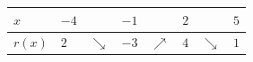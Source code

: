 \documentclass[border=.4pt]{standalone}
\begin{document}
\color{ink}\begin{tabular}{|>{\centering\arraybackslash}m{1.7cm}|>{\centering\arraybackslash}m{1.25cm}|>{\centering\arraybackslash}m{1.25cm}|>{\centering\arraybackslash}m{1.25cm}|>{\centering\arraybackslash}m{1.25cm}|>{\centering\arraybackslash}m{1.25cm}|>{\centering\arraybackslash}m{1.25cm}|>{\centering\arraybackslash}m{1.25cm}|}\hline
\cellcolor{head}$x$ & \cellcolor{head}$-4$ & \cellcolor{head} & \cellcolor{head}$-1$ & \cellcolor{head} & \cellcolor{head}$2$ & \cellcolor{head} & \cellcolor{head}$5$ \\ \hline
\cellcolor{head}$r(x)$ & $2$ & \color{focus}\large $\searrow$ & $-3$ & \color{focus}\large $\nearrow$ & $4$ & \color{focus}\large $\searrow$ & $1$ \\ \hline\end{tabular}
\end{document}
